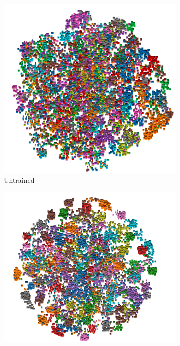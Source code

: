 \begin{figure}[h]
\begin{subfigure}[b]{0.3\textwidth}
  \includegraphics[width=\textwidth]{figures/untrained.png}  
  \caption{Untrained}
  \label{fig:0e}
\end{subfigure}
\hfill
\begin{subfigure}[b]{0.3\textwidth}
  \includegraphics[width=\textwidth]{figures/5e_tsne.png}  

\end{subfigure}
\end{figure}
